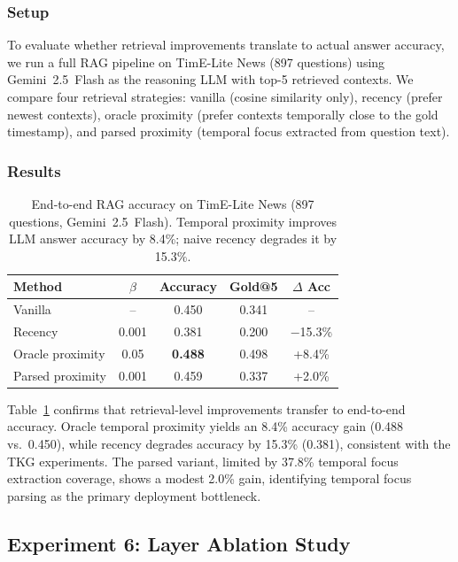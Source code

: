 \documentclass[conference]{IEEEtran}
\begin{document}
\subsubsection{Setup}
To evaluate whether retrieval improvements translate to actual answer accuracy, we run a full RAG pipeline on TimE-Lite News (897 questions) using Gemini~2.5~Flash as the reasoning LLM with top-5 retrieved contexts. We compare four retrieval strategies: vanilla (cosine similarity only), recency (prefer newest contexts), oracle proximity (prefer contexts temporally close to the gold timestamp), and parsed proximity (temporal focus extracted from question text).

\subsubsection{Results}

\begin{table}[t]
\centering
\caption{End-to-end RAG accuracy on TimE-Lite News (897 questions, Gemini~2.5~Flash). Temporal proximity improves LLM answer accuracy by 8.4\%; naive recency degrades it by 15.3\%.}
\label{tab:e2e}
\begin{tabular}{@{}lcccc@{}}
\toprule
\textbf{Method} & \textbf{$\beta$} & \textbf{Accuracy} & \textbf{Gold@5} & \textbf{$\Delta$ Acc} \\
\midrule
Vanilla & -- & 0.450 & 0.341 & -- \\
Recency & 0.001 & 0.381 & 0.200 & $-$15.3\% \\
Oracle proximity & 0.05 & \textbf{0.488} & 0.498 & +8.4\% \\
Parsed proximity & 0.001 & 0.459 & 0.337 & +2.0\% \\
\bottomrule
\end{tabular}
\end{table}

Table~\ref{tab:e2e} confirms that retrieval-level improvements transfer to end-to-end accuracy. Oracle temporal proximity yields an 8.4\% accuracy gain (0.488 vs.\ 0.450), while recency degrades accuracy by 15.3\% (0.381), consistent with the TKG experiments. The parsed variant, limited by 37.8\% temporal focus extraction coverage, shows a modest 2.0\% gain, identifying temporal focus parsing as the primary deployment bottleneck.

\subsection{Experiment 6: Layer Ablation Study}
\end{document}
